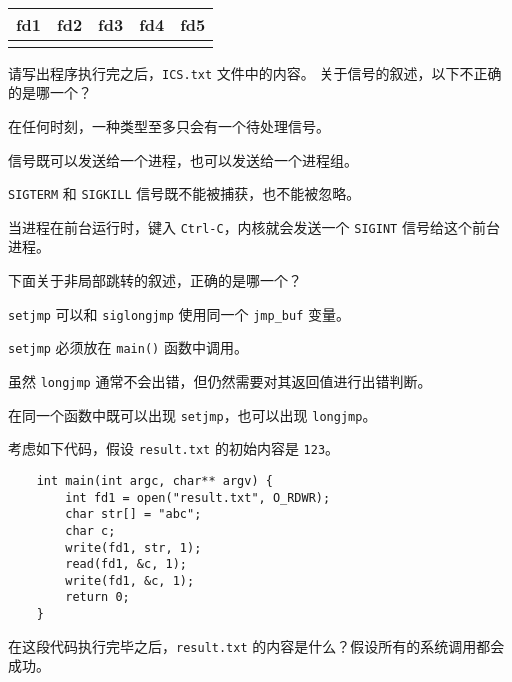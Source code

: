 \begin{problems}
        \begin{table}[H]
            \tt
            \centering
            \begin{tabular}{|c|c|c|c|c|}
                \hline
                fd1 & fd2 & fd3 & fd4 & fd5 \\ \hline
                {\qquad \qquad} & {\qquad \qquad} & {\qquad \qquad} & {\qquad \qquad} & {\qquad \qquad} \\ \hline
            \end{tabular}
        \end{table}
        \qn 请写出程序执行完之后，\verb|ICS.txt| 文件中的内容。
         关于信号的叙述，以下不正确的是哪一个？
        \begin{choices}
            \item 在任何时刻，一种类型至多只会有一个待处理信号。
            \item 信号既可以发送给一个进程，也可以发送给一个进程组。
            \item \verb|SIGTERM| 和 \verb|SIGKILL| 信号既不能被捕获，也不能被忽略。
            \item 当进程在前台运行时，键入 \verb|Ctrl-C|，内核就会发送一个 \verb|SIGINT| 信号给这个前台进程。
        \end{choices}
         下面关于非局部跳转的叙述，正确的是哪一个？
        \begin{choices}
            \item \verb|setjmp| 可以和 \verb|siglongjmp| 使用同一个 \verb|jmp_buf| 变量。
            \item \verb|setjmp| 必须放在 \verb|main()| 函数中调用。
            \item 虽然 \verb|longjmp| 通常不会出错，但仍然需要对其返回值进行出错判断。
            \item 在同一个函数中既可以出现 \verb|setjmp|，也可以出现 \verb|longjmp|。
        \end{choices}
         考虑如下代码，假设 \verb|result.txt| 的初始内容是 \verb|123|。
        \begin{verbatim}
    int main(int argc, char** argv) {
        int fd1 = open("result.txt", O_RDWR);
        char str[] = "abc";
        char c;
        write(fd1, str, 1);
        read(fd1, &c, 1);
        write(fd1, &c, 1);
        return 0;
    }
        \end{verbatim}
        在这段代码执行完毕之后，\verb|result.txt| 的内容是什么？假设所有的系统调用都会成功。
        \begin{choices}

\end{choices}
\end{problems}
